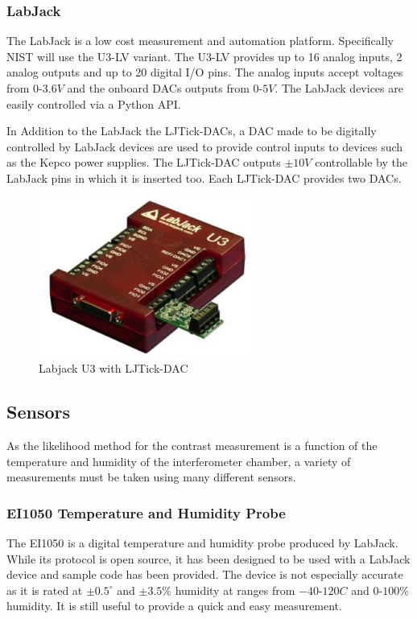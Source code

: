 \subsubsection{LabJack}
The LabJack is a low cost measurement and automation platform. Specifically NIST will use the U3-LV variant. The U3-LV provides up to 16 analog inputs, 2 analog outputs and up to 20 digital I/O pins. The analog inputs accept voltages from $0$-$3.6V$ and the onboard DACs outputs from $0$-$5V$. The LabJack devices are easily controlled via a Python API. 

In Addition to the LabJack the LJTick-DACs, a DAC made to be digitally controlled by LabJack devices are used to provide control inputs to devices such as the Kepco power supplies. The LJTick-DAC outputs $\pm10V$  controllable by the LabJack pins in which it is inserted too. Each LJTick-DAC provides two DACs. 
\begin{figure}[ht!]
\centering
\includegraphics[scale=0.5]{Figures/labjack.png}
\caption{Labjack U3 with LJTick-DAC}
\label{fig:labjack}
\end{figure}
\subsection{Sensors}
As the likelihood method for the contrast measurement is a function of the temperature and humidity of the interferometer chamber, a variety of measurements must be taken using many different sensors.
\subsubsection{EI1050 Temperature and Humidity Probe}
The EI1050 is a digital temperature and humidity probe produced by LabJack. While its protocol is open source, it has been designed to be used with a LabJack device and sample code has been provided. The device is not especially accurate as it is rated at $\pm0.5^{\circ}$ and $\pm3.5\%$ humidity at ranges from $-40$-$120C$ and $0$-$100\%$ humidity. It is still useful to provide a quick and easy measurement. 
